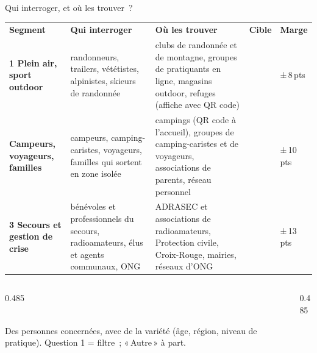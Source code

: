\begin{frame}{Qui interroger, et où les trouver~?}
  \scriptsize\renewcommand{\arraystretch}{1.2}\setlength{\tabcolsep}{4pt}
   
  \noindent\begin{tabular}{@{}>{\raggedright\arraybackslash\bfseries}p{2.3cm}>{\raggedright\arraybackslash}p{3.6cm}>{\raggedright\arraybackslash}p{4.8cm}>{\centering\arraybackslash}p{0.8cm}>{\centering\arraybackslash}p{1.0cm}@{}}
    \rowcolor{insarose}\textcolor{insarouge}{Segment} & \textcolor{insarouge}{\bfseries Qui interroger} & \textcolor{insarouge}{\bfseries Où les trouver} & \textcolor{insarouge}{\bfseries Cible} & \textcolor{insarouge}{\bfseries Marge}\\
    1 Plein air, sport outdoor &
      randonneurs, trailers, vététistes, alpinistes, skieurs de randonnée &
      clubs de randonnée et de montagne, groupes de pratiquants en ligne, magasins outdoor, refuges (affiche avec QR code) & 150 & ±\,8\,pts\\
    \arrayrulecolor{insagris!30}\hline
    2 Campeurs, voyageurs, familles &
      campeurs, camping-caristes, voyageurs, familles qui sortent en zone isolée &
      campings (QR code à l'accueil), groupes de camping-caristes et de voyageurs, associations de parents, réseau personnel & 100 & ±\,10\,pts\\
    \hline
    3 Secours et gestion de crise &
      bénévoles et professionnels du secours, radioamateurs, élus et agents communaux, ONG &
      ADRASEC et associations de radioamateurs, Protection civile, Croix-Rouge, mairies, réseaux d'ONG & 60 & ±\,13\,pts\\
  \end{tabular}
  \vspace{0.2cm}
  \begin{columns}[T]
    \begin{column}{0.485\textwidth}
      \begin{carte}[height=1.55cm,valign=top]
        \raggedright{}\\[1pt]
        {\footnotesize Des personnes concernées, avec de la variété (âge, région, niveau de pratique). Question 1 = filtre~; «\,Autre\,» à part.}
      \end{carte}
    \end{column}
    \begin{column}{0.485\textwidth}

\end{column}
\end{columns}
\end{frame}
